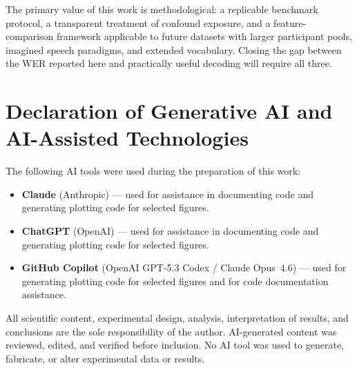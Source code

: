 \documentclass[11pt,a4paper]{article}
\begin{document}
The primary value of this work is methodological: a replicable benchmark
protocol, a transparent treatment of confound exposure, and a
feature-comparison framework applicable to future datasets with larger
participant pools, imagined speech paradigms, and extended vocabulary.
Closing the gap between the WER reported here and practically useful
decoding will require all three.

\section*{Declaration of Generative AI and AI-Assisted Technologies}

\begin{mdframed}[backgroundcolor=gray!8, linecolor=gray!40, linewidth=0.7pt,
                 innerleftmargin=12pt, innerrightmargin=12pt,
                 innertopmargin=10pt, innerbottommargin=10pt]
The following AI tools were used during the preparation of this work:

\begin{itemize}[leftmargin=1.4em, itemsep=3pt]
  \item \textbf{Claude} (Anthropic) --- used for assistance in documenting
    code and generating plotting code for selected figures.
  \item \textbf{ChatGPT} (OpenAI) --- used for assistance in documenting
    code and generating plotting code for selected figures.
  \item \textbf{GitHub Copilot} (OpenAI GPT-5.3 Codex / Claude Opus~4.6) ---
    used for generating plotting code for selected figures and for code
    documentation assistance.
\end{itemize}

All scientific content, experimental design, analysis, interpretation of
results, and conclusions are the sole responsibility of the author. AI-generated
content was reviewed, edited, and verified before inclusion. No AI tool was used
to generate, fabricate, or alter experimental data or results.
\end{mdframed}




\appendix
\end{document}
